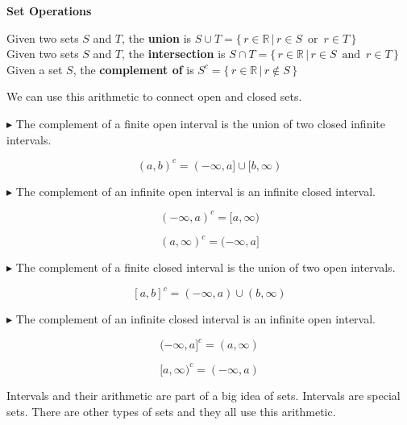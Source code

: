 \documentclass{ximera}
\begin{document}
\begin{idea} \textbf{\textcolor{blue!55!black}{Set Operations}} 


Given two sets $S$ and $T$, the \textbf{union} is $S \cup T = \{ \, r \in \mathbb{R} \, | \, r \in S \, \text{ or } \, r \in T  \,   \}$ \\

Given two sets $S$ and $T$, the \textbf{intersection} is $S \cap T = \{ \, r \in \mathbb{R} \, | \, r \in S \, \text{ and } \, r \in T  \,   \}$ \\
 
Given a set $S$, the \textbf{complement of} is $S^{c}  = \{ \, r \in \mathbb{R} \, | \, r \not\in S \,  \}$ 


\end{idea}







We can use this arithmetic to connect open and closed sets.

$\blacktriangleright$ The complement of a finite open interval is the union of two closed infinite intervals.

\[    (a,b)^{c}  = (-\infty, a] \cup [b, \infty)          \]



$\blacktriangleright$ The complement of an infinite open interval is an infinite closed interval.

\[     (-\infty, a)^{c} = [a, \infty)          \]

\[     (a, \infty)^{c} = (-\infty, a]          \]



$\blacktriangleright$ The complement of a finite closed interval is the union of two open intervals.

\[    [a,b]^{c}  = (-\infty, a) \cup (b, \infty)          \]



$\blacktriangleright$ The complement of an infinite closed interval is an infinite open interval.

\[     (-\infty, a]^{c} = (a, \infty)          \]

\[     [a, \infty)^{c} = (-\infty, a)          \]









Intervals and their arithmetic are part of a big idea of sets.  Intervals are special sets.  There are other types of sets and they all use this arithmetic.
\end{document}
